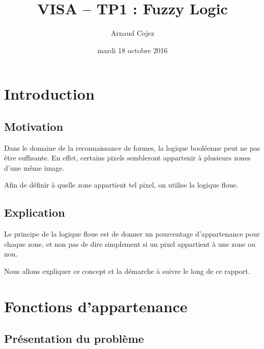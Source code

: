 \documentclass[a4paper]{article}
\begin{document}
\title{VISA -- TP1 : Fuzzy Logic}
\author{Arnaud Cojez}
\date{mardi 18 octobre 2016}

\maketitle

\newpage
\tableofcontents
\newpage

\section{Introduction}

\subsection{Motivation}
Dans le domaine de la reconnaissance de formes, la logique booléenne peut ne pas être suffisante. En effet, certains pixels sembleront appartenir à plusieurs zones d'une même image.

Afin de définir à quelle zone appartient tel pixel, on utilise la logique floue.

\subsection{Explication}
Le principe de la logique floue est de donner un pourcentage d'appartenance pour chaque zone, et non pas de dire simplement si un pixel appartient à une zone ou non.

Nous allons expliquer ce concept et la démarche à suivre le long de ce rapport.

\clearpage

\section{Fonctions d'appartenance}

\subsection{Présentation du problème}
\end{document}
